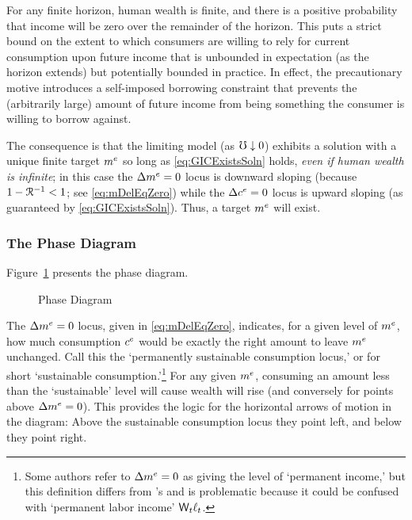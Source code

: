 \documentclass{handout}
\begin{document}
For any finite horizon, human wealth is finite, and there is a positive probability that income will be zero over the remainder of the horizon.  This puts a strict bound on the extent to which consumers are willing to rely for current consumption upon future income that is unbounded in expectation (as the horizon extends) but potentially bounded in practice.  In effect, the precautionary motive introduces a self-imposed borrowing constraint that prevents the (arbitrarily large) amount of future income from being something the consumer is willing to borrow against.

The consequence is that the limiting model (as $\mho \downarrow 0$) exhibits a solution with a unique finite target $m^{e}$ so long as \eqref{eq:GICExistsSoln} holds, {\it even if human wealth is infinite}; in this case the $\Delta m^{e}=0$ locus is downward sloping (because $1-\mathcal{R}^{-1}<1$; see \eqref{eq:mDelEqZero}) while the $\Delta c^{e}=0$ locus is upward sloping (as guaranteed by \eqref{eq:GICExistsSoln}).  Thus, a target $m^{e}$ will exist.

\subsubsection{The Phase Diagram}

Figure~\ref{fig:PhaseDiag} presents the phase diagram.
\begin{figure}
\caption{Phase Diagram}\label{fig:PhaseDiag}
\end{figure}


The $\Delta \mRatE_{\tSS} = 0$ locus, given in \eqref{eq:mDelEqZero},
indicates, for a given level of $\mRatE_{\tSS}$, how much consumption
$\cRatE_{\tSS}$ would be exactly the right amount to leave $m^{e}$
unchanged.  Call this the `permanently sustainable consumption locus,' or for short `sustainable consumption.'\footnote{Some authors refer to $\Delta \mRatE_{\tSS} = 0$ as giving the level of `permanent income,' but this definition differs from \cite{friedmanATheory}'s and is 
problematic because it could be confused with `permanent labor income' $\mathsf{W}_{t} \ell_{t}$.}  For any given $m^{e}$, consuming an amount less than the `sustainable' level will cause wealth will rise (and conversely for points above $\Delta m^{e} =0$).  This provides the logic for
the horizontal arrows of motion in the diagram: Above the sustainable consumption locus
they point left, and below they point right.

\end{document}
